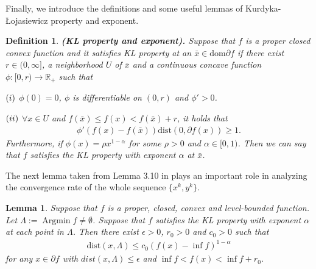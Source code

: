 \documentclass{article}
\numberwithin{equation}{section}
\newtheorem{lemma}{Lemma}[section]
\newtheorem{definition}{Definition}[section]
\def\Argmin{\mathop{\mathrm{Argmin}}}
\begin{document}
Finally, we introduce the definitions and some useful lemmas of Kurdyka-\L{}ojasiewicz property and exponent.
\begin{definition}
    {\rm{\textbf{(KL property and exponent).}}} Suppose that $f$ is a proper closed convex function and it satisfies KL property 
    at an $\bar{x}\in \mathrm{dom} \partial f$ if there exist $r\in (0,\infty]$, a neighborhood $U$ of $\bar{x}$
    and a continuous concave function $\phi: [0,r) \rightarrow \mathbb{R}_+$ such that

    $(\romannumeral1)$ $\phi(0) = 0$, $\phi$ is differentiable on $(0,r)$ and $\phi' >0$.

    $(\romannumeral2)$ $\forall x\in U$ and $f(\bar{x}) \leq f(x) < f(\bar{x}) +r$, it holds that
                            \begin{align}
                                \phi'(f(x)-f(\bar{x}))\mathrm{dist}(0,\partial f(x)) \geq 1. \nonumber
                            \end{align}
    Furthermore, if $\phi(x) = \rho x^{1-\alpha}$ for some $\rho>0$ and $\alpha\in[0,1)$. Then we can 
    say that $f$ satisfies the KL property with exponent $\alpha$ at $\bar{x}$. 
\end{definition}

The next lemma taken from Lemma 3.10 in \cite{bolte2014proximal} plays an important role in analyzing the convergence rate of the whole sequence
$\{x^k,y^k\}$. 
\begin{lemma} \label{error_bound}
    Suppose that $f$ is a proper, closed, convex and level-bounded function. 
    Let $\Lambda := \Argmin f \neq \emptyset$. Suppose that $f$ satisfies the KL property with exponent $\alpha$ 
    at each point in $\Lambda$. Then there exist $\epsilon>0$, $r_0>0$ and $c_0>0$ such that
    \begin{align}
        \mathrm{dist}(x,\Lambda) \leq c_0 (f(x)-\inf f)^{1-\alpha} \nonumber
    \end{align}
    for any $x\in \partial f$ with $dist(x,\Lambda) \leq \epsilon$ and $\inf f <f(x) < \inf f+ r_0$.
\end{lemma}
\end{document}
